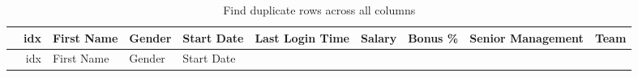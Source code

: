 \documentclass [oneside,10pt,a4paper,ngerman,BCOR10mm,headsepline,parindent,final]{scrartcl}
\begin{document}
    \begin{longtable}[]{@{}rrllllrrll@{}}
\caption{Find duplicate rows across all columns}\tabularnewline
\toprule
\begin{minipage}[b]{0.03\columnwidth}\raggedleft
\strut
\end{minipage} & \begin{minipage}[b]{0.04\columnwidth}\raggedleft
idx\strut
\end{minipage} & \begin{minipage}[b]{0.08\columnwidth}\raggedright
First Name\strut
\end{minipage} & \begin{minipage}[b]{0.06\columnwidth}\raggedright
Gender\strut
\end{minipage} & \begin{minipage}[b]{0.08\columnwidth}\raggedright
Start Date\strut
\end{minipage} & \begin{minipage}[b]{0.10\columnwidth}\raggedright
Last Login Time\strut
\end{minipage} & \begin{minipage}[b]{0.06\columnwidth}\raggedleft
Salary\strut
\end{minipage} & \begin{minipage}[b]{0.06\columnwidth}\raggedleft
Bonus \%\strut
\end{minipage} & \begin{minipage}[b]{0.12\columnwidth}\raggedright
Senior Management\strut
\end{minipage} & \begin{minipage}[b]{0.12\columnwidth}\raggedright
Team\strut
\end{minipage}\tabularnewline
\midrule
\endfirsthead
\toprule
\begin{minipage}[b]{0.03\columnwidth}\raggedleft
\strut
\end{minipage} & \begin{minipage}[b]{0.04\columnwidth}\raggedleft
idx\strut
\end{minipage} & \begin{minipage}[b]{0.08\columnwidth}\raggedright
First Name\strut
\end{minipage} & \begin{minipage}[b]{0.06\columnwidth}\raggedright
Gender\strut
\end{minipage} & \begin{minipage}[b]{0.08\columnwidth}\raggedright
Start Date\strut
\end{minipage} & \begin{minipage}[b]{0.10\columnwidth}\raggedright

\end{minipage}
\end{longtable}
\end{document}
